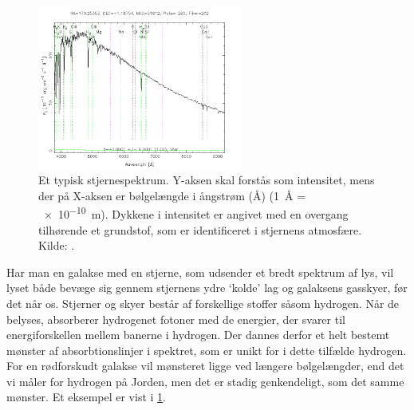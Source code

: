 \documentclass[crop=false, class=memoir]{standalone}
\begin{document}
\begin{figure}[H]
	\centering
	\includegraphics[width=0.6\textwidth]{fig/spektrum.png}
	\caption{Et typisk stjernespektrum. Y-aksen skal forstås som intensitet, mens der	på X-aksen er bølgelængde i ångstrøm (\si{\angstrom}) (\SI{1}{\angstrom} = \SI{e-10}{\meter}). Dykkene i intensitet er angivet med en overgang tilhørende et grundstof, som er identificeret i stjernens atmosfære. Kilde: \cite{Stjernespektrum}.}
    \label{stjerner:fig:spektrum}
\end{figure}
    
Har man en galakse med en stjerne, som udsender et bredt spektrum af lys, vil lyset både bevæge sig gennem stjernens ydre `kolde' lag og galaksens gasskyer, før det når os. Stjerner og skyer består af forskellige stoffer såsom hydrogen. Når de belyses, absorberer hydrogenet fotoner med de energier, der svarer til energiforskellen mellem banerne i hydrogen. Der dannes derfor et helt bestemt mønster af absorbtionslinjer i spektret, som er unikt for i dette tilfælde hydrogen. For en rødforskudt galakse vil mønsteret ligge ved længere bølgelængder, end det vi måler for hydrogen på Jorden, men det er stadig genkendeligt, som det samme mønster. Et eksempel er vist i \cref{stjerner:fig:spektrum}. 
\end{document}
